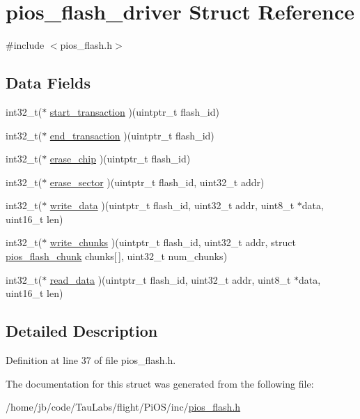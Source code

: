 \hypertarget{structpios__flash__driver}{\section{pios\-\_\-flash\-\_\-driver \-Struct \-Reference}
\label{structpios__flash__driver}
}


{\ttfamily \#include $<$pios\-\_\-flash.\-h$>$}

\subsection*{\-Data \-Fields}
\begin{DoxyCompactItemize}
\item 
int32\-\_\-t($\ast$ \hyperlink{group___p_i_o_s___f_l_a_s_h_ga3128721bfc5d4b157f9c8866d10d80f0}{start\-\_\-transaction} )(uintptr\-\_\-t flash\-\_\-id)
\item 
int32\-\_\-t($\ast$ \hyperlink{group___p_i_o_s___f_l_a_s_h_ga775db43adcb0c42ede668aef36016301}{end\-\_\-transaction} )(uintptr\-\_\-t flash\-\_\-id)
\item 
int32\-\_\-t($\ast$ \hyperlink{group___p_i_o_s___f_l_a_s_h_ga38768b3295a563897e91191bfead95b5}{erase\-\_\-chip} )(uintptr\-\_\-t flash\-\_\-id)
\item 
int32\-\_\-t($\ast$ \hyperlink{group___p_i_o_s___f_l_a_s_h_ga91676d432517e3a2ea7303a07cd1bde3}{erase\-\_\-sector} )(uintptr\-\_\-t flash\-\_\-id, uint32\-\_\-t addr)
\item 
int32\-\_\-t($\ast$ \hyperlink{group___p_i_o_s___f_l_a_s_h_ga019d8ac125523464c1068f1170852dd0}{write\-\_\-data} )(uintptr\-\_\-t flash\-\_\-id, uint32\-\_\-t addr, uint8\-\_\-t $\ast$data, uint16\-\_\-t len)
\item 
int32\-\_\-t($\ast$ \hyperlink{group___p_i_o_s___f_l_a_s_h_ga5bac463e83aa46ce41c151c74ff8467b}{write\-\_\-chunks} )(uintptr\-\_\-t flash\-\_\-id, uint32\-\_\-t addr, struct \hyperlink{structpios__flash__chunk}{pios\-\_\-flash\-\_\-chunk} chunks\mbox{[}$\,$\mbox{]}, uint32\-\_\-t num\-\_\-chunks)
\item 
int32\-\_\-t($\ast$ \hyperlink{group___p_i_o_s___f_l_a_s_h_ga5499ff7cdf896098a6eb43f2f32dc40a}{read\-\_\-data} )(uintptr\-\_\-t flash\-\_\-id, uint32\-\_\-t addr, uint8\-\_\-t $\ast$data, uint16\-\_\-t len)
\end{DoxyCompactItemize}


\subsection{\-Detailed \-Description}


\-Definition at line 37 of file pios\-\_\-flash.\-h.



\-The documentation for this struct was generated from the following file\-:\begin{DoxyCompactItemize}
\item 
/home/jb/code/\-Tau\-Labs/flight/\-Pi\-O\-S/inc/\hyperlink{pios__flash_8h}{pios\-\_\-flash.\-h}\end{DoxyCompactItemize}
